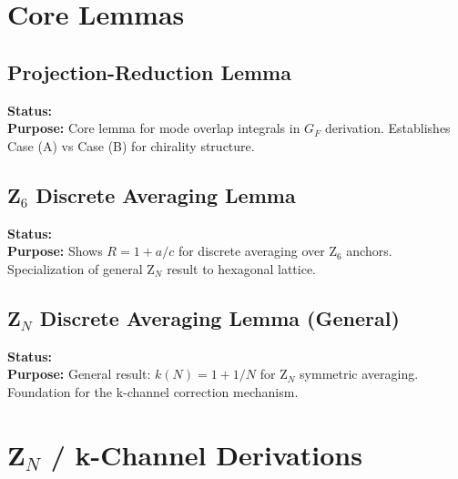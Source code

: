 \section*{Core Lemmas}

\subsection*{Projection-Reduction Lemma}
\textbf{Status:} \tagDer{} \\
\textbf{Purpose:} Core lemma for mode overlap integrals in $G_F$ derivation.
Establishes Case (A) vs Case (B) for chirality structure.



\subsection*{Z$_6$ Discrete Averaging Lemma}
\textbf{Status:} \tagDer{} \\
\textbf{Purpose:} Shows $R = 1 + a/c$ for discrete averaging over Z$_6$ anchors.
Specialization of general Z$_N$ result to hexagonal lattice.



\subsection*{Z$_N$ Discrete Averaging Lemma (General)}
\textbf{Status:} \tagDer{} \\
\textbf{Purpose:} General result: $k(N) = 1 + 1/N$ for Z$_N$ symmetric averaging.
Foundation for the k-channel correction mechanism.



\section*{Z$_N$ / k-Channel Derivations}

